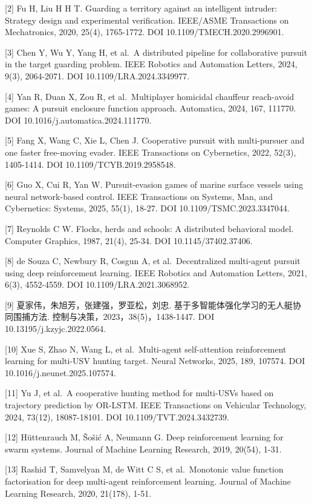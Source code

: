 \documentclass[UTF8,a4paper,zihao=5,fontset=none]{ctexart}
\begin{document}
{[}2{]} Fu H, Liu H H T. Guarding a territory against an intelligent
intruder: Strategy design and experimental verification. IEEE/ASME
Transactions on Mechatronics, 2020, 25(4), 1765-1772. DOI
10.1109/TMECH.2020.2996901.

{[}3{]} Chen Y, Wu Y, Yang H, et al.~A distributed pipeline for
collaborative pursuit in the target guarding problem. IEEE Robotics and
Automation Letters, 2024, 9(3), 2064-2071. DOI 10.1109/LRA.2024.3349977.

{[}4{]} Yan R, Duan X, Zou R, et al.~Multiplayer homicidal chauffeur
reach-avoid games: A pursuit enclosure function approach. Automatica,
2024, 167, 111770. DOI 10.1016/j.automatica.2024.111770.

{[}5{]} Fang X, Wang C, Xie L, Chen J. Cooperative pursuit with
multi-pursuer and one faster free-moving evader. IEEE Transactions on
Cybernetics, 2022, 52(3), 1405-1414. DOI 10.1109/TCYB.2019.2958548.

{[}6{]} Guo X, Cui R, Yan W. Pursuit-evasion games of marine surface
vessels using neural network-based control. IEEE Transactions on
Systems, Man, and Cybernetics: Systems, 2025, 55(1), 18-27. DOI
10.1109/TSMC.2023.3347044.

{[}7{]} Reynolds C W. Flocks, herds and schools: A distributed
behavioral model. Computer Graphics, 1987, 21(4), 25-34. DOI
10.1145/37402.37406.

{[}8{]} de Souza C, Newbury R, Cosgun A, et al.~Decentralized
multi-agent pursuit using deep reinforcement learning. IEEE Robotics and
Automation Letters, 2021, 6(3), 4552-4559. DOI 10.1109/LRA.2021.3068952.

{[}9{]} 夏家伟，朱旭芳，张建强，罗亚松，刘忠.
基于多智能体强化学习的无人艇协同围捕方法.
控制与决策，2023，38(5)，1438-1447. DOI 10.13195/j.kzyjc.2022.0564.

{[}10{]} Xue S, Zhao N, Wang L, et al.~Multi-agent self-attention
reinforcement learning for multi-USV hunting target. Neural Networks,
2025, 189, 107574. DOI 10.1016/j.neunet.2025.107574.

{[}11{]} Yu J, et al.~A cooperative hunting method for multi-USVs based
on trajectory prediction by OR-LSTM. IEEE Transactions on Vehicular
Technology, 2024, 73(12), 18087-18101. DOI 10.1109/TVT.2024.3432739.

{[}12{]} Hüttenrauch M, Šošić A, Neumann G. Deep reinforcement learning
for swarm systems. Journal of Machine Learning Research, 2019, 20(54),
1-31.

{[}13{]} Rashid T, Samvelyan M, de Witt C S, et al.~Monotonic value
function factorisation for deep multi-agent reinforcement learning.
Journal of Machine Learning Research, 2020, 21(178), 1-51.
\end{document}
